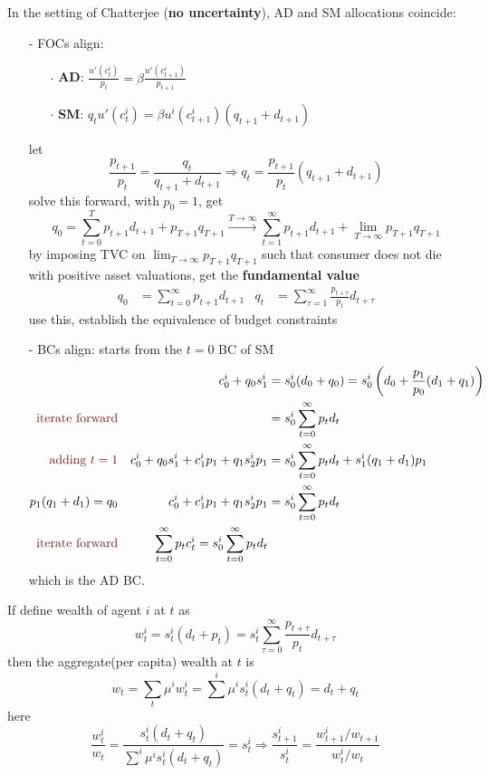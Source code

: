 \documentclass[10pt,landscape,a4paper]{article}
\begin{document}
\begin{multicols*}{3}
In the setting of Chatterjee (\textbf{no uncertainty}), AD and SM allocations coincide:
\begin{itemize}
    \item[-] FOCs align:
    \begin{itemize}
        \item[$\cdot$]\textbf{AD}: $\frac{u'(c^i_t)}{p_t}=\beta \frac{u'(c^i_{t+1})}{p_{t+1}}$
        \item[$\cdot$]\textbf{SM}: $q_tu'(c^i_t)=\beta u^i(c^i_{t+1})(q_{t+1}+d_{t+1})$
    \end{itemize}
    let 
    $$
    \frac{p_{t+1}}{p_t} = \frac{q_t}{q_{t+1}+d_{t+1}} \Rightarrow q_t = \frac{p_{t+1}}{p_t}(q_{t+1}+d_{t+1})
    $$
    solve this forward, with $p_0=1$, get
    $$
    q_0 = \sum^T_{t=0}p_{t+1}d_{t+1} + p_{T+1}q_{T+1} \xrightarrow{T\rightarrow\infty} \sum^{\infty}_{t=1}p_{t+1}d_{t+1}+\lim_{T\rightarrow\infty}p_{T+1}q_{T+1}
    $$
    by imposing TVC on $\lim_{T\rightarrow\infty}p_{T+1}q_{T+1}$ such that consumer does not die with positive asset valuations, get the \textbf{\color{myred}fundamental value}
    \begin{align*}
        q_0 &= \sum^{\infty}_{t=0}p_{t+1}d_{t+1} & q_t &= \sum^\infty_{\tau=1}\frac{p_{t+\tau}}{p_t}d_{t+\tau}
    \end{align*}
    use this, establish the equivalence of budget constraints
\item[-] BCs align: starts from the $t=0$ BC of SM
\begin{align*}
   & & c_0^i+q_0 s_1^i &= s_0^i(d_0+q_0) =s_0^i\left( d_0 +\frac{p_1}{p_0}(d_1+q_1) \right)\\
    \text{\color{myred}iterate forward} & & &= s_0^i \sum^{\infty}_{t=0}p_td_t\\
    \text{\color{myred}adding $t=1$} & & c_0^i+q_0s_1^i+c_1^ip_1+q_1s_2^ip_1&=s_0^i\sum^{\infty}_{t=0}p_td_t+s_1^i(q_1+d_1)p_1\\
    p_1(q_1+d_1)=q_0 & & c_0^i+c_1^ip_1+q_1s_2^ip_1 &= s_0^i\sum^{\infty}_{t=0}p_td_t\\
    \text{\color{myred}iterate forward} & & \sum^{\infty}_{t=0}p_tc_t^i = s_0^i\sum^{\infty}_{t=0}p_td_t
\end{align*}
which is the AD BC.
\end{itemize}

If define wealth of agent $i$ at $t$ as
$$
w_t^i= s_t^i(d_t+p_t) = s_t^i\sum^{\infty}_{\tau=0}\frac{p_{t+\tau}}{p_t}d_{t+\tau}
$$
then the aggregate(per capita) wealth at $t$ is
$$
w_t = \sum_t\mu^i w_t^i=\sum^i\mu^is_t^i(d_t+q_t)=d_t+q_t
$$
here 
$$
\frac{w_t^i}{w_t} = \frac{s_t^i(d_t+q_t)}{\sum^i\mu^is_t^i(d_t+q_t)} = s_t^i \Rightarrow \frac{s_{t+1}^i}{s_t^i} = \frac{w_{t+1}^i/w_{t+1}}{w_t^i/w_t}
$$


\end{multicols*}
\end{document}
